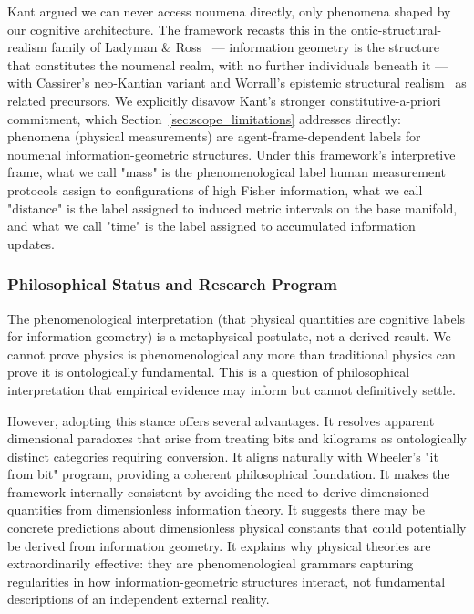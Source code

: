 \documentclass[11pt]{article}
\begin{document}
Kant argued we can never access noumena directly, only phenomena shaped by our cognitive architecture. The framework recasts this in the ontic-structural-realism family of Ladyman \& Ross~\cite{Ladyman2007} — information geometry is the structure that constitutes the noumenal realm, with no further individuals beneath it — with Cassirer's neo-Kantian variant and Worrall's epistemic structural realism~\cite{Worrall1989} as related precursors. We explicitly disavow Kant's stronger constitutive-a-priori commitment, which Section~\ref{sec:scope_limitations} addresses directly: phenomena (physical measurements) are agent-frame-dependent labels for noumenal information-geometric structures. Under this framework's interpretive frame, what we call "mass" is the phenomenological label human measurement protocols assign to configurations of high Fisher information, what we call "distance" is the label assigned to induced metric intervals on the base manifold, and what we call "time" is the label assigned to accumulated information updates.

\subsubsection{Philosophical Status and Research Program}

The phenomenological interpretation (that physical quantities are cognitive labels for information geometry) is a metaphysical postulate, not a derived result. We cannot prove physics is phenomenological any more than traditional physics can prove it is ontologically fundamental. This is a question of philosophical interpretation that empirical evidence may inform but cannot definitively settle.

However, adopting this stance offers several advantages. It resolves apparent dimensional paradoxes that arise from treating bits and kilograms as ontologically distinct categories requiring conversion. It aligns naturally with Wheeler's "it from bit" program, providing a coherent philosophical foundation. It makes the framework internally consistent by avoiding the need to derive dimensioned quantities from dimensionless information theory. It suggests there may be concrete predictions about dimensionless physical constants that could potentially be derived from information geometry. It explains why physical theories are extraordinarily effective: they are phenomenological grammars capturing regularities in how information-geometric structures interact, not fundamental descriptions of an independent external reality.
\end{document}
